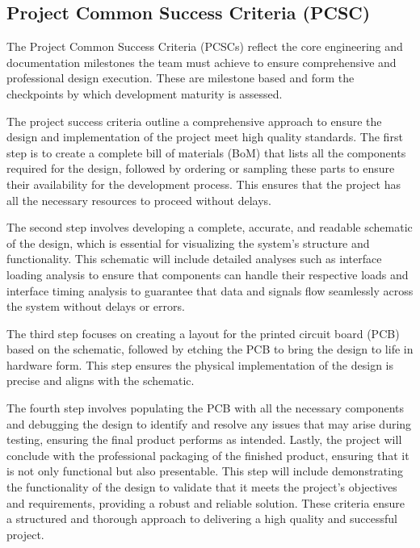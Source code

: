 \documentclass[12pt]{article}
\begin{document}
\subsection{Project Common Success Criteria (PCSC)}

\par The Project Common Success Criteria (PCSCs) reflect the core engineering and documentation milestones the team must achieve to ensure comprehensive and professional design execution. These are milestone based and form the checkpoints by which development maturity is assessed.

\par The project success criteria outline a comprehensive approach to ensure the design and implementation of the project meet high quality standards. The first step is to create a complete bill of materials (BoM) that lists all the components required for the design, followed by ordering or sampling these parts to ensure their availability for the development process. This ensures that the project has all the necessary resources to proceed without delays. 

\par The second step involves developing a complete, accurate, and readable schematic of the design, which is essential for visualizing the system’s structure and functionality. This schematic will include detailed analyses such as interface loading analysis to ensure that components can handle their respective loads and interface timing analysis to guarantee that data and signals flow seamlessly across the system without delays or errors.

\par The third step focuses on creating a layout for the printed circuit board (PCB) based on the schematic, followed by etching the PCB to bring the design to life in hardware form. This step ensures the physical implementation of the design is precise and aligns with the schematic. 

\par The fourth step involves populating the PCB with all the necessary components and debugging the design to identify and resolve any issues that may arise during testing, ensuring the final product performs as intended. Lastly, the project will conclude with the professional packaging of the finished product, ensuring that it is not only functional but also presentable. This step will include demonstrating the functionality of the design to validate that it meets the project's objectives and requirements, providing a robust and reliable solution. These criteria ensure a structured and thorough approach to delivering a high quality and successful project.
\end{document}
